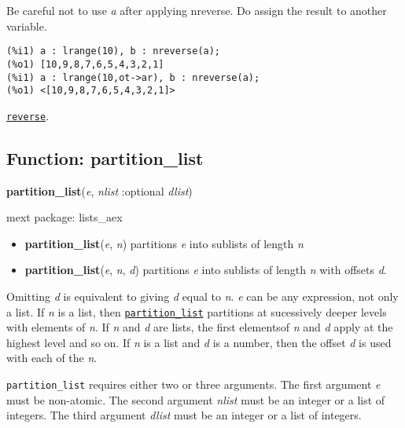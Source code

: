 \documentclass[]{article}
\begin{document}
\vspace{5 pt}


   Be careful not to use {\it a} after applying nreverse. Do assign the result 
   to another variable. 

\begin{Verbatim}[frame=single]
(%i1) a : lrange(10), b : nreverse(a);
(%o1) [10,9,8,7,6,5,4,3,2,1]
(%i1) a : lrange(10,ot->ar), b : nreverse(a);
(%o1) <[10,9,8,7,6,5,4,3,2,1]>
\end{Verbatim}


 \hyperlink{reverse}{{\tt reverse}}.

\vspace{5 pt}


\subsection{Function: partition\_list\label{sec:partition_list}}
\hypertarget{partition_list}{}
{\bf partition\_list}({\it e}, {\it nlist} :optional {\it dlist})


\noindent mext package: lists\_aex



\vspace{5 pt}
\begin{itemize}
\item[] {\bf partition\_list}({\it e}, {\it n})
  partitions {\it e} into sublists of length {\it n} 

\item[] {\bf partition\_list}({\it e}, {\it n}, {\it d})
  partitions {\it e} into sublists of length {\it n} with offsets {\it d}. 

\end{itemize}
Omitting {\it d} is equivalent to giving {\it d} equal to {\it n}. {\it e} can be any expression, not only a list. If {\it n} is a list, then \hyperlink{partition_list}{{\tt partition\_list}} partitions at sucessively deeper levels with elements of {\it n}. If {\it n} and {\it d} are lists, the 
first elementsof {\it n} and {\it d} apply at the highest level and so on. If {\it n} is a list and {\it d} is a number, then the offset {\it d} is used with each of the {\it n}. 

\vspace{5 pt}

   {\tt partition\_list} requires either two or three arguments.
    The first argument {\it e} must be non-atomic.
    The second argument {\it nlist} must be an integer or a list of integers.
    The third argument {\it dlist} must be an integer or a list of integers.
\end{document}
